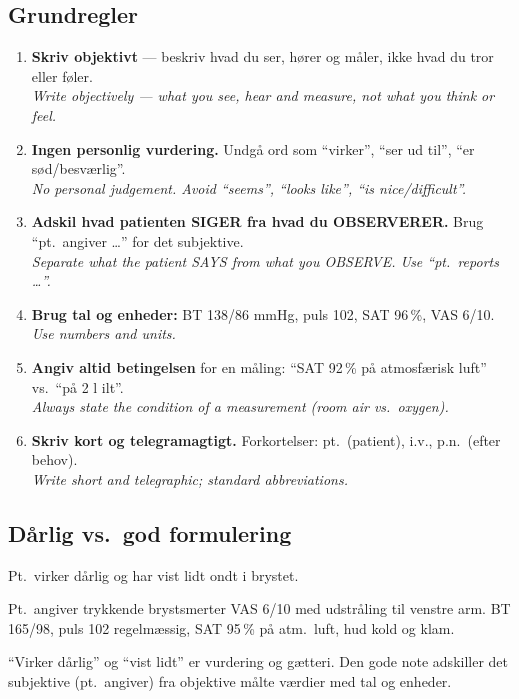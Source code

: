 \documentclass[11pt,a4paper]{report}
\newcommand{\eng}[1]{\textcolor{en}{\itshape #1}}       %
\begin{document}
\subsection{Grundregler}
\begin{enumerate}[leftmargin=1.4em,itemsep=4pt]
\item \textbf{Skriv objektivt} --- beskriv hvad du ser, hører og måler, ikke hvad du tror eller føler.\\ \eng{Write objectively --- what you see, hear and measure, not what you think or feel.}
\item \textbf{Ingen personlig vurdering.} Undgå ord som ``virker'', ``ser ud til'', ``er sød/besværlig''.\\ \eng{No personal judgement. Avoid ``seems'', ``looks like'', ``is nice/difficult''.}
\item \textbf{Adskil hvad patienten SIGER fra hvad du OBSERVERER.} Brug ``pt.\ angiver \ldots'' for det subjektive.\\ \eng{Separate what the patient SAYS from what you OBSERVE. Use ``pt.\ reports \ldots''.}
\item \textbf{Brug tal og enheder:} BT 138/86 mmHg, puls 102, SAT 96\,\%, VAS 6/10.\\ \eng{Use numbers and units.}
\item \textbf{Angiv altid betingelsen} for en måling: ``SAT 92\,\% på atmosfærisk luft'' vs.\ ``på 2 l ilt''.\\ \eng{Always state the condition of a measurement (room air vs.\ oxygen).}
\item \textbf{Skriv kort og telegramagtigt.} Forkortelser: pt.\ (patient), i.v., p.n.\ (efter behov).\\ \eng{Write short and telegraphic; standard abbreviations.}
\end{enumerate}

\subsection{Dårlig vs.\ god formulering}

\begin{daarligbox}Pt.\ virker dårlig og har vist lidt ondt i brystet.\end{daarligbox}
\begin{godbox}Pt.\ angiver trykkende brystsmerter VAS 6/10 med udstråling til venstre arm. BT 165/98, puls 102 regelmæssig, SAT 95\,\% på atm.\ luft, hud kold og klam.\end{godbox}
\begin{hvorforbox}``Virker dårlig'' og ``vist lidt'' er vurdering og gætteri. Den gode note adskiller det subjektive (pt.\ angiver) fra objektive målte værdier med tal og enheder.\end{hvorforbox}
\medskip
\end{document}
